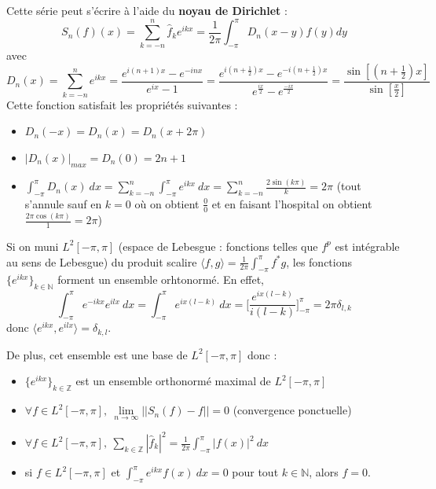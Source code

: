 \begin{definition}
    Cette série peut s'écrire à l'aide du \textbf{noyau de Dirichlet} :
    \begin{equation*}
        S_n(f)(x) = \sum_{k=-n}^n\hat{f}_ke^{ikx} = \frac{1}{2\pi}\int_{-\pi}^\pi D_n(x-y)f(y)dy
    \end{equation*}
    avec
    \begin{equation*}
        D_n(x) = \sum_{k=-n}^n e^{ikx} = \frac{e^{i(n+1)x}-e^{-inx}}{e^{ix}-1} = \frac{e^{i(n+\frac{1}{2})x}-e^{-i(n+\frac{1}{2})x}}{e^{\frac{ix}{2}}-e^{\frac{-ix}{2}}} = \frac{\sin[(n+\frac{1}{2})x]}{\sin[\frac{x}{2}]}
    \end{equation*}
    Cette fonction satisfait les propriétés suivantes :
    \begin{itemize}
        \item $D_n(-x)=D_n(x)=D_n(x+2\pi)$
        \item $|D_n(x)|_{max} = D_n(0)=2n+1$
        \item $\int_{-\pi}^\pi D_n(x)\ dx = \sum\limits_{k=-n}^n \int_{-\pi}^\pi e^{ikx}\ dx = \sum_{k=-n}^n \frac{2\sin(k\pi)}{k} = 2\pi$ (tout s'annule sauf en $k=0$ où on obtient $\frac{0}{0}$ et en faisant l'hospital on obtient $\frac{2\pi\cos(k\pi)}{1}=2\pi$)
    \end{itemize}
\end{definition}

\begin{theo}
    Si on muni $ L^2[-\pi,\pi]$ (espace de Lebesgue :  fonctions telles que $f^p$ est intégrable au sens de Lebesgue) du produit scalire $\langle f,g\rangle = \frac{1}{2\pi}\int_{-\pi}^\pi f^*g$, les fonctions $\{e^{ikx}\}_{k\in\mathbb{N}}$ forment un ensemble orhtonormé. En effet,
    \begin{equation*}
        \int_{-\pi}^\pi e^{-ikx}e^{ilx} \ dx = \int_{-\pi}^\pi e^{ix (l-k)} \ dx = \Bigg[\frac{e^{ix(l-k)}}{i(l-k)}\Bigg]_{-\pi}^\pi = 2\pi\delta_{l,k}
    \end{equation*}
    donc $\langle e^{ikx},e^{ilx}\rangle = \delta_{k,l}$.
    
    De plus, cet ensemble est une base de $ L^2[-\pi,\pi]$ donc :
    \begin{itemize}
        \item $\{e^{ikx}\}_{k\in\mathbb{Z}}$ est un ensemble orthonormé maximal de $ L^2[-\pi,\pi]$
        \item $\forall f\in L^2[-\pi,\pi],\ \lim\limits_{n\to\infty}||S_n(f)-f||=0$ (convergence ponctuelle)
        \item $\forall f\in L^2[-\pi,\pi],\ \sum\limits_{k\in\mathbb{Z}}|\hat{f}_k|^2=\frac{1}{2\pi}\int_{-\pi}^\pi |f(x)|^2\ dx$
        \item si $f\in L^2[-\pi,\pi]$ et $\int_{-\pi}^\pi e^{ikx}f(x)\ dx = 0$ pour tout $k\in\mathbb{N}$, alors $f=0$.
    \end{itemize}
\end{theo}

